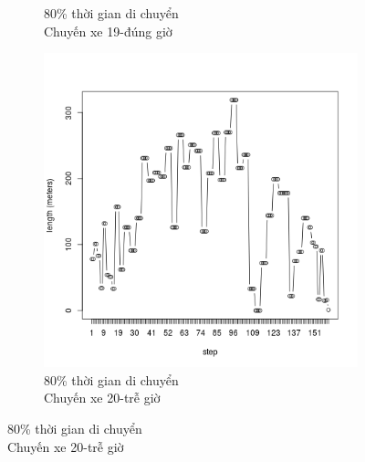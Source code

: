 \documentclass[a4paper, 13pt]{report}
\begin{document}
\begin{figure}
\begin{subfigure}[b]{0.25\textwidth}
                \caption*{80\% thời gian di chuyển\\Chuyến xe 19-đúng giờ}
        \end{subfigure}%
        \begin{subfigure}[b]{0.25\textwidth}
                \includegraphics[width=\linewidth]{test20}
                \caption*{80\% thời gian di chuyển\\Chuyến xe 20-trễ giờ}
        \end{subfigure}
\end{figure}
\end{document}
